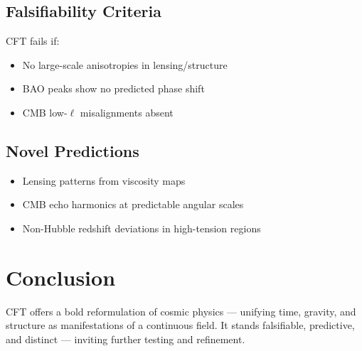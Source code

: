 \documentclass[11pt]{article}
\begin{document}
\subsection{Falsifiability Criteria}
CFT fails if:
\begin{itemize}
    \item No large-scale anisotropies in lensing/structure
    \item BAO peaks show no predicted phase shift
    \item CMB low-$\ell$ misalignments absent
\end{itemize}

\subsection{Novel Predictions}
\begin{itemize}
    \item Lensing patterns from viscosity maps
    \item CMB echo harmonics at predictable angular scales
    \item Non-Hubble redshift deviations in high-tension regions
\end{itemize}

\section*{Conclusion}
CFT offers a bold reformulation of cosmic physics — unifying time, gravity, and structure as manifestations of a continuous field. It stands falsifiable, predictive, and distinct — inviting further testing and refinement.
\end{document}
